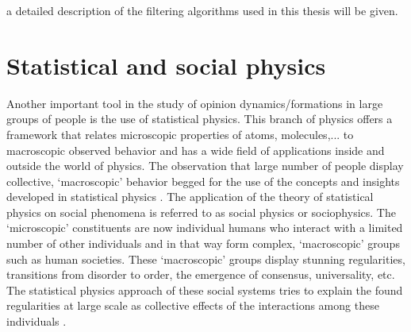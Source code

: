\documentclass[11 pt , letterpaper , twoside , openright]{book}
\begin{document}
a detailed description of the filtering algorithms used in  this thesis will be given.


\section{Statistical and social physics}

Another important tool in the study of opinion dynamics/formations in large groups of people is the use of statistical physics. This branch of physics offers a framework that relates microscopic properties of atoms, molecules,... to macroscopic observed behavior and has a wide field of applications inside and outside the world of physics. The observation that large number of people display collective, `macroscopic' behavior begged for the use of the concepts and insights developed in statistical physics \cite{Sirbu2016}. The application of the theory of statistical physics on social phenomena is referred to as social physics or sociophysics. The `microscopic' constituents are now individual humans who interact with a limited number of other individuals and in that way form complex, `macroscopic' groups such as human societies. These `macroscopic' groups display stunning regularities, transitions from disorder to order, the emergence of consensus, universality, etc. The statistical physics approach of these social systems tries to explain the found regularities at large scale as collective effects of the interactions among these individuals \cite{Sirbu2016}.


\end{document}
